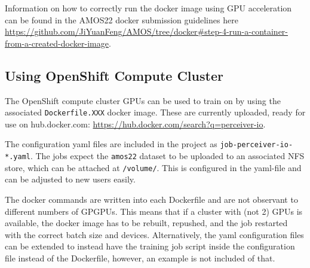 \documentclass{l4proj}
\begin{document}
\begin{appendices}
Information on how to correctly run the docker image using GPU acceleration can be found in the AMOS22 docker submission guidelines here \url{https://github.com/JiYuanFeng/AMOS/tree/docker#step-4-run-a-container-from-a-created-docker-image}.

\subsection{Using OpenShift Compute Cluster}

The OpenShift compute cluster GPUs can be used to train on by using the associated \lstinline{Dockerfile.XXX} docker image. These are currently uploaded, ready for use on hub.docker.com: \url{https://hub.docker.com/search?q=perceiver-io}.

The configuration yaml files are included in the project as \lstinline{job-perceiver-io-*.yaml}. The jobs expect the \lstinline{amos22} dataset to be uploaded to an associated NFS store, which can be attached at \lstinline{/volume/}. This is configured in the yaml-file and can be adjusted to new users easily.

The docker commands are written into each Dockerfile and are not observant to different numbers of GPGPUs. This means that if a cluster with (not 2) GPUs is available, the docker image has to be rebuilt, repushed, and the job restarted with the correct batch size and devices. Alternatively, the yaml configuration files can be extended to instead have the training job script inside the configuration file instead of the Dockerfile, however, an example is not included of that.

\end{appendices}





\renewcommand{\thechapter}{0} 

\end{document}
